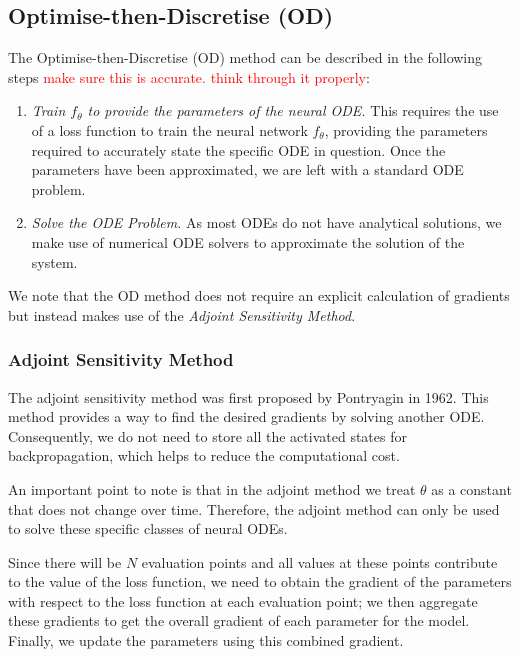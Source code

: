 \documentclass[a4paper,11pt,titlepage]{article}
\theoremstyle{definition}
\theoremstyle{plain}
\theoremstyle{remark}
\begin{document}
\subsection{Optimise-then-Discretise (OD)}
\label{sec:od}

The Optimise-then-Discretise (OD) method can be described in the following steps \textcolor{red}{make sure this is accurate. think through it properly}:
\begin{enumerate}
    \item \textit{Train $f_\theta$ to provide the parameters of the neural ODE.} This requires the use of a loss function to train the neural network $f_\theta$, providing the parameters required to accurately state the specific ODE in question. Once the parameters have been approximated, we are left with a standard ODE problem.
    \item \textit{Solve the ODE Problem.} As most ODEs do not have analytical solutions, we make use of numerical ODE solvers to approximate the solution of the system.
\end{enumerate}

We note that the OD method does not require an explicit calculation of gradients but instead makes use of the \textit{Adjoint Sensitivity Method}.

\subsubsection{Adjoint Sensitivity Method}

The adjoint sensitivity method was first proposed by Pontryagin in 1962\cite{pontryagin2018mathematical}. This method provides a way to find the desired gradients by solving another ODE. Consequently, we do not need to store all the activated states for backpropagation, which helps to reduce the computational cost. 

An important point to note is that in the adjoint method we treat $\theta$ as a constant that does not change over time. Therefore, the adjoint method can only be used to solve these specific classes of neural ODEs.

Since there will be $N$ evaluation points and all values at these points contribute to the value of the loss function, we need to obtain the gradient of the parameters with respect to the loss function at each evaluation point; we then aggregate these gradients to get the overall gradient of each parameter for the model. Finally, we update the parameters using this combined gradient.
\end{document}
